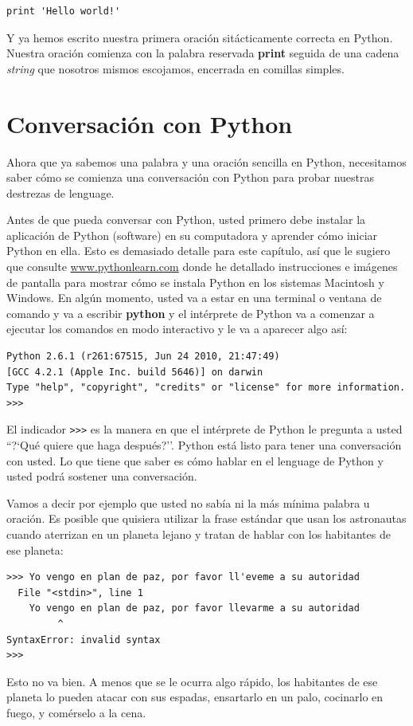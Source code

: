 \beforeverb
\begin{verbatim}
print 'Hello world!'
\end{verbatim}
\afterverb

Y ya hemos escrito nuestra primera oraci\'on sit\'acticamente correcta en Python.
Nuestra oraci\'on comienza con la palabra reservada {\bf print} seguida de una cadena \textit{string} que nosotros mismos escojamos, encerrada en comillas simples.

\section{Conversaci\'on con Python}

Ahora que ya sabemos una palabra y una oraci\'on sencilla  en Python,
necesitamos saber c\'omo se comienza una conversaci\'on con Python para probar 
nuestras destrezas de lenguage.

Antes de que pueda conversar con Python, usted primero debe instalar la aplicaci\'on de Python
(software) en su computadora y aprender c\'omo iniciar Python en ella. Esto es demasiado detalle para este cap\'itulo, as\'i que le sugiero que consulte \url{www.pythonlearn.com} donde he detallado instrucciones e im\'agenes de pantalla para mostrar c\'omo se instala Python 
en los sistemas Macintosh y Windows. En alg\'un momento, usted va a estar en 
una terminal o ventana de comando y va a escribir {\bf python} y el int\'erprete 
de Python va a comenzar a ejecutar los comandos en modo interactivo 
y le va a aparecer algo as\'i:

\beforeverb
\begin{verbatim}
Python 2.6.1 (r261:67515, Jun 24 2010, 21:47:49) 
[GCC 4.2.1 (Apple Inc. build 5646)] on darwin
Type "help", "copyright", "credits" or "license" for more information.
>>> 
\end{verbatim}
\afterverb
%
El indicador {\tt >>>} es la manera en que el int\'erprete de Python le pregunta a usted ``?`Qu\'e quiere que haga despu\'es?''. Python est\'a listo para tener una conversaci\'on con usted. Lo que tiene que saber es c\'omo hablar en el lenguage de Python y usted podr\'a sostener una conversaci\'on.

Vamos a decir por ejemplo que usted no sab\'ia ni la m\'as m\'inima palabra u oraci\'on. Es posible que quisiera utilizar la frase est\'andar que usan los astronautas cuando aterrizan en un planeta lejano y tratan de hablar con los habitantes de ese planeta:

\beforeverb
\begin{verbatim}
>>> Yo vengo en plan de paz, por favor ll'eveme a su autoridad 
  File "<stdin>", line 1
    Yo vengo en plan de paz, por favor llevarme a su autoridad
         ^
SyntaxError: invalid syntax
>>> 
\end{verbatim}
\afterverb
%
Esto no va bien. A menos que se le ocurra algo r\'apido, los habitantes de ese planeta lo pueden atacar con sus espadas, ensartarlo en un palo, cocinarlo en fuego, y com\'erselo a la cena.


